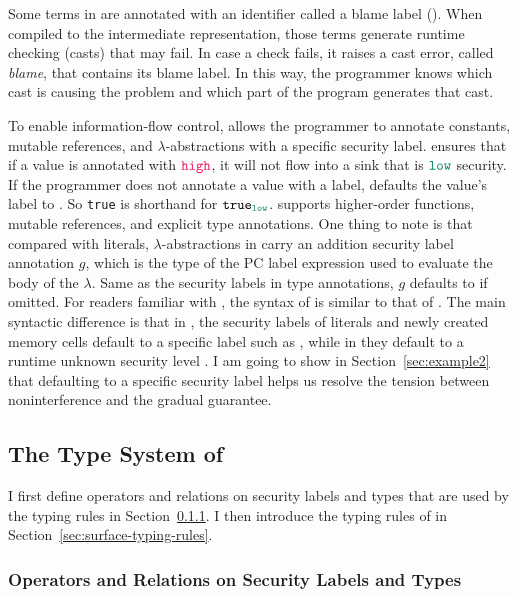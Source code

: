 Some terms in \Surface are annotated with an identifier called a blame label
(). When compiled to the intermediate representation, those terms generate
runtime checking (casts) that may fail. In case a check fails, it raises a cast
error, called \textit{blame}, that contains its blame label. In this way, the
programmer knows which cast is causing the problem and which part of the program
generates that cast.

To enable information-flow control, \Surface allows the programmer to annotate
constants, mutable references, and $\lambda$-abstractions with a specific
security label. \Surface ensures that if a value is annotated with $\high$, it
will not flow into a sink that is $\low$ security. If the programmer does not
annotate a value with a label, \Surface defaults the value's label to \low. So
\texttt{true} is shorthand for $\mathtt{true}_{\low}$. \Surface supports
higher-order functions, mutable references, and explicit type annotations. One
thing to note is that compared with literals, $\lambda$-abstractions in \Surface
carry an addition security label annotation $g$, which is the type of the PC
label expression used to evaluate the body of the $\lambda$. Same as the
security labels in type annotations, $g$ defaults to \unk if omitted. For
readers familiar with \GSLRef, the syntax of \Surface is similar to that of
\GSLRef. The main syntactic difference is that in \Surface, the security labels
of literals and newly created memory cells default to a specific label such as
\low, while in \GSLRef they default to a runtime unknown security level \unk. I
am going to show in Section~\ref{sec:example2} that defaulting to a specific
security label helps us resolve the tension between noninterference and the
gradual guarantee.

\subsection{The Type System of \Surface}
\label{sec:surface-typing}

I first define operators and relations on security labels and types that are
used by the typing rules in Section~\ref{sec:ops-and-rels}. I then introduce
the typing rules of \Surface in Section~\ref{sec:surface-typing-rules}.

\subsubsection{Operators and Relations on Security Labels and Types}
\label{sec:ops-and-rels}

